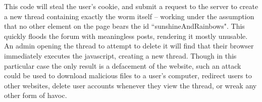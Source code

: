 
This code will steal the user's cookie, and submit a request to the server to create a new thread containing exactly the
worm itself -- working under the assumption that no other element on the page bears the id ``sunshineAndRainbows". This
quickly floods the forum with meaningless posts, rendering it mostly unusable. An admin opening the thread to attempt to
delete it will find that their browser immediately executes the javascript, creating a new thread. Though in this
particular case the only result is a defacement of the website, such an attack could be used to download malicious files
to a user's computer, redirect users to other websites, delete user accounts whenever they view the thread, or wreak any
other form of havoc.

